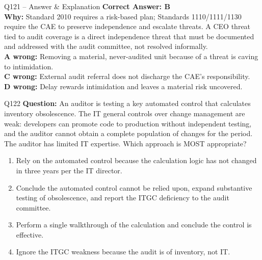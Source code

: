 \documentclass[aspectratio=169,10pt]{beamer}
\begin{document}
	\begin{frame}[t]{Q121 -- Answer \& Explanation}
		\small
		\textbf{Correct Answer: B} \\[4pt]
		\textbf{Why:} Standard 2010 requires a risk-based plan; Standards 1110/1111/1130 require the CAE to preserve independence and escalate threats. A CEO threat tied to audit coverage is a direct independence threat that must be documented and addressed with the audit committee, not resolved informally. \\[4pt]
		\textbf{A wrong:} Removing a material, never-audited unit because of a threat is caving to intimidation. \\[2pt]
		\textbf{C wrong:} External audit referral does not discharge the CAE's responsibility. \\[2pt]
		\textbf{D wrong:} Delay rewards intimidation and leaves a material risk uncovered.
	\end{frame}
	
	\begin{frame}[t]{Q122}
		\small
		\textbf{Question:} An auditor is testing a key automated control that calculates inventory obsolescence. The IT general controls over change management are weak: developers can promote code to production without independent testing, and the auditor cannot obtain a complete population of changes for the period. The auditor has limited IT expertise. Which approach is MOST appropriate?
		\begin{enumerate}[label=\Alph*.,itemsep=1pt,topsep=2pt]
			\item Rely on the automated control because the calculation logic has not changed in three years per the IT director.
			\item Conclude the automated control cannot be relied upon, expand substantive testing of obsolescence, and report the ITGC deficiency to the audit committee.
			\item Perform a single walkthrough of the calculation and conclude the control is effective.
			\item Ignore the ITGC weakness because the audit is of inventory, not IT.
		\end{enumerate}
	\end{frame}
	
\end{document}
